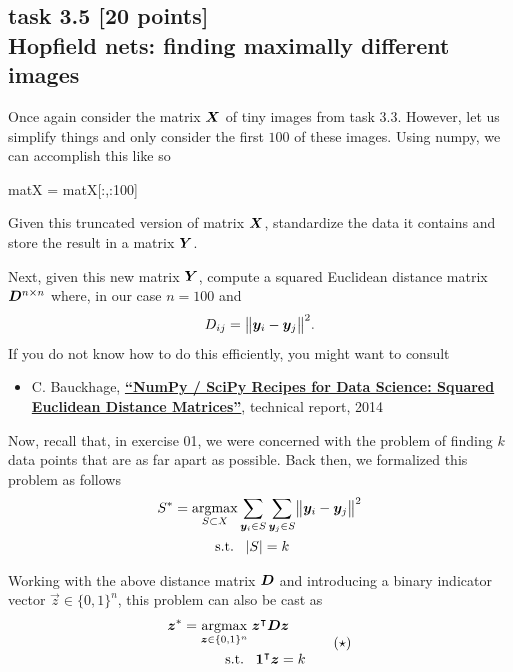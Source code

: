 
\subsection*{task 3.5 [20 points] \\[1ex] Hopfield nets: finding maximally different images}

Once again consider the matrix $\bm{X}$ of tiny images from task 3.3. However, let us simplify things and only consider the first $100$ of these images. Using numpy, we can accomplish this like so
\begin{python}
matX = matX[:,:100]
\end{python}

Given this truncated version of matrix $\bm{X}$, standardize the data it contains and store the result in a matrix $\bm{Y}$.

Next, given this new matrix $\bm{Y}$, compute a squared Euclidean distance matrix $\bm{D}^{n \times n}$ where, in our case $n=100$ and
\begin{equation*}
D_{ij} = \bigl \lVert \bm{y}_i - \bm{y}_j \bigr \rVert^2.
\end{equation*}
If you do not know how to do this efficiently, you might want to consult
\begin{itemize}
\item[] C. Bauckhage, \href{https://www.researchgate.net/publication/266617010_NumPy_SciPy_Recipes_for_Data_Science_Squared_Euclidean_Distance_Matrices}{\textbf{``NumPy / SciPy Recipes for Data Science: Squared Euclidean Distance Matrices''}}, technical report, 2014 
\end{itemize}

\vspace{2cm}


Now, recall that, in exercise 01, we were concerned with the problem of finding $k$ data points that are as far apart as possible. Back then, we formalized this problem as follows
\begin{align*}
S^* = \operatorname*{argmax}_{S \subset X} & \sum_{\bm{y}_i \in S} \sum_{\bm{y}_j \in S} \bigl \lVert \bm{y}_i - \bm{y}_j \bigr \rVert^2 \\
\operatorname{s.\!t.} \; & \; \; \lvert S \rvert = k
\end{align*}

Working with the above distance matrix $\bm{D}$ and introducing a binary indicator vector $\vec{z} \in \{ 0, 1 \}^n$, this problem can also be cast as
\begin{equation}
\begin{aligned}
\bm{z}^* = \operatorname*{argmax}_{\bm{z} \in \{ 0, 1 \}^n} & \; \bm{z}^\intercal \bm{D} \bm{z} \\
\operatorname{s.\!t.} \; & \; \; \bm{1}^\intercal \bm{z} = k
\end{aligned}
\tag{$\star$}
\end{equation}

